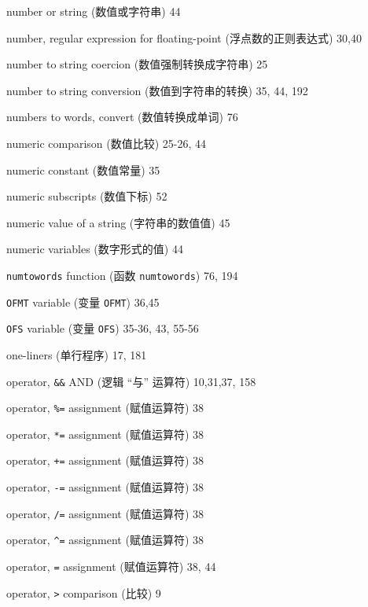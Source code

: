 \begin{multicols}{3}
\hangindent=3pc  number or string (数值或字符串) 44

\hangindent=3pc  number, regular expression for floating-point
(浮点数的正则表达式) 30,40

\hangindent=3pc  number to string coercion
(数值强制转换成字符串) 25

\hangindent=3pc  number to string conversion (数值到字符串的转换)
35,  44, 192

\hangindent=3pc  numbers to words, convert (数值转换成单词) 76

\hangindent=3pc  numeric comparison (数值比较) 25-26, 44

\hangindent=3pc  numeric constant (数值常量) 35

\hangindent=3pc  numeric subscripts (数值下标) 52

\hangindent=3pc  numeric value of a string (字符串的数值值) 45

\hangindent=3pc  numeric variables (数字形式的值) 44

\hangindent=3pc  \verb'numtowords' function (函数
\verb'numtowords') 76, 194

\hangindent=3pc  \verb'OFMT' variable (变量 \verb'OFMT') 36,45

\hangindent=3pc  \verb'OFS' variable (变量 \verb'OFS')
35-36, 43, 55-56

\hangindent=3pc  one-liners (单行程序) 17, 181

\hangindent=3pc  operator, \verb'&&' AND (逻辑 ``与'' 运算符)
10,31,37, 158

\hangindent=3pc  operator, \verb'%=' assignment (赋值运算符) 38

\hangindent=3pc  operator, \verb'*=' assignment (赋值运算符) 38

\hangindent=3pc  operator, \verb'+=' assignment (赋值运算符) 38

\hangindent=3pc  operator, \verb'-=' assignment (赋值运算符) 38

\hangindent=3pc  operator, \verb'/=' assignment (赋值运算符) 38

\hangindent=3pc  operator, \verb'^=' assignment (赋值运算符) 38

\hangindent=3pc  operator, \verb'=' assignment (赋值运算符) 38, 44

\hangindent=3pc  operator, \verb'>' comparison (比较) 9


\end{multicols}
